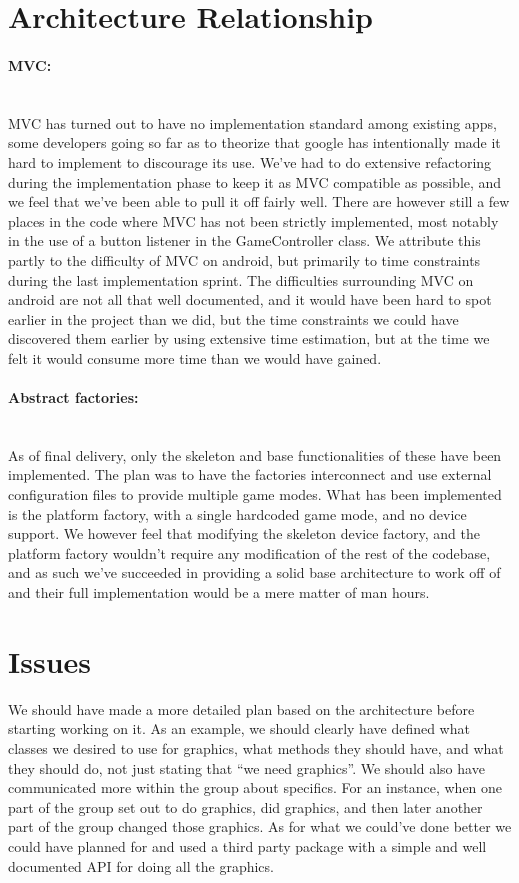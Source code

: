 \documentclass[12pt, a4paper]{article}
\begin{document}
\section{Architecture Relationship}
\paragraph{MVC:}\\
MVC has turned out to have no implementation standard among existing apps, some
developers going so far as to theorize that google has intentionally made it
hard to implement to discourage its use. We’ve had to do extensive refactoring
during the implementation phase to keep it as MVC compatible as possible, and we
feel that we’ve been able to pull it off fairly well. There are however still a
few places in the code where MVC has not been strictly implemented, most notably
in the use of a button listener in the GameController class. We attribute this
partly to the difficulty of MVC on android, but primarily to time constraints
during the last implementation sprint.
The difficulties surrounding MVC on android are not all that well documented,
and it would have been hard to spot earlier in the project than we did, but the
time constraints we could have discovered them earlier by using extensive time
estimation, but at the time we felt it would consume more time than we would
have gained.

\paragraph{Abstract factories:}\\
As of final delivery, only the skeleton and base functionalities of these have
been implemented.
The plan was to have the factories interconnect and use external configuration
files to provide multiple game modes. What has been implemented is the platform
factory, with a single hardcoded game mode, and no device support.
We however feel that modifying the skeleton device factory, and the platform
factory wouldn’t require any modification of the rest of the codebase, and as
such we’ve succeeded in providing a solid base architecture to work off of and
their full implementation would be a mere matter of man hours.

\section{Issues}
We should have made a more detailed plan based on the architecture before
starting working on it. As an example, we should clearly have defined what
classes we desired to use for graphics, what methods they should have, and what
they should do, not just stating that “we need graphics”.
We should also have communicated more within the group about specifics. For an
instance, when one part of the group set out to do graphics, did graphics, and
then later another part of the group changed those graphics.
As for what we could’ve done better we could have planned for and used a third
party package with a simple and well documented API for doing all the graphics. 
\end{document}
